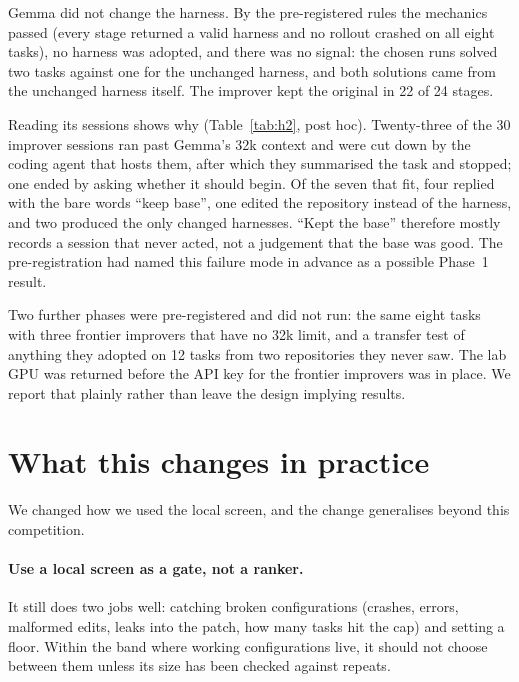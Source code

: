 \documentclass[11pt]{article}
\begin{document}
Gemma did not change the harness. By the pre-registered rules the mechanics passed (every stage returned a valid harness and
no rollout crashed on all eight tasks), no harness was adopted, and there was no signal: the chosen runs solved two tasks
against one for the unchanged harness, and both solutions came from the unchanged harness itself. The improver kept the
original in 22 of 24 stages.

Reading its sessions shows why (Table~\ref{tab:h2}, post hoc). Twenty-three of the 30 improver sessions ran past Gemma's 32k
context and were cut down by the coding agent that hosts them, after which they summarised the task and stopped; one ended by
asking whether it should begin. Of the seven that fit, four replied with the bare words ``keep base'', one edited the
repository instead of the harness, and two produced the only changed harnesses. ``Kept the base'' therefore mostly records a
session that never acted, not a judgement that the base was good. The pre-registration had named this failure mode in advance
as a possible Phase~1 result.

Two further phases were pre-registered and did not run: the same eight tasks with three frontier improvers that have no 32k
limit, and a transfer test of anything they adopted on 12 tasks from two repositories they never saw. The lab GPU was
returned before the API key for the frontier improvers was in place. We report that plainly rather than leave the design
implying results.

\begin{table}[t]
\centering\small

\caption{Harness$^2$ improver sessions with Gemma 4 31B as its own improver (eight tasks). ``Overflowed'' counts sessions
whose reply shows the host agent's context-compaction notice.}
\label{tab:h2}
\end{table}

\section{What this changes in practice}
\label{sec:practice}

We changed how we used the local screen, and the change generalises beyond this competition.

\paragraph{Use a local screen as a gate, not a ranker.} It still does two jobs well: catching broken configurations
(crashes, errors, malformed edits, leaks into the patch, how many tasks hit the cap) and setting a floor. Within the band where
working configurations live, it should not choose between them unless its size has been checked against repeats.
\end{document}
